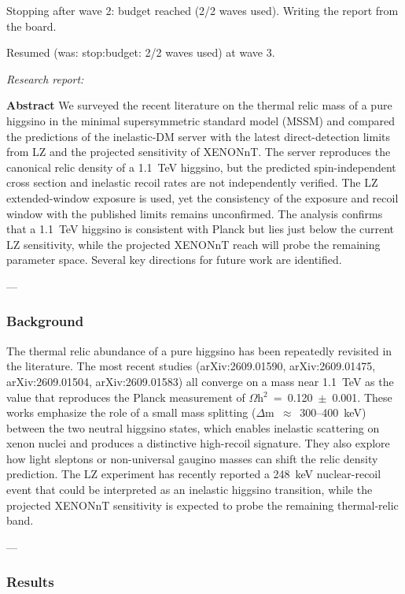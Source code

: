 \documentclass[11pt,a4paper]{article}
\begin{document}
Stopping after wave 2: budget reached (2/2 waves used). Writing the report from the board.

Resumed (was: stop:budget: 2/2 waves used) at wave 3.

\textit{Research report:}\par
\textbf{Abstract} We surveyed the recent literature on the thermal relic mass of a pure higgsino in the minimal supersymmetric standard model (MSSM) and compared the predictions of the inelastic-DM server with the latest direct-detection limits from LZ and the projected sensitivity of XENONnT.  The server reproduces the canonical relic density of a 1.1~TeV higgsino, but the predicted spin-independent cross section and inelastic recoil rates are not independently verified.  The LZ extended-window exposure is used, yet the consistency of the exposure and recoil window with the published limits remains unconfirmed.  The analysis confirms that a 1.1~TeV higgsino is consistent with Planck but lies just below the current LZ sensitivity, while the projected XENONnT reach will probe the remaining parameter space.  Several key directions for future work are identified.

---

\subsubsection*{Background}
The thermal relic abundance of a pure higgsino has been repeatedly revisited in the literature.  The most recent studies (arXiv:2609.01590, arXiv:2609.01475, arXiv:2609.01504, arXiv:2609.01583) all converge on a mass near 1.1~TeV as the value that reproduces the Planck measurement of $\Omega$h$^2$~=~0.120~$\pm$~0.001.  These works emphasize the role of a small mass splitting ($\Delta$m~$\approx$~300--400~keV) between the two neutral higgsino states, which enables inelastic scattering on xenon nuclei and produces a distinctive high-recoil signature.  They also explore how light sleptons or non-universal gaugino masses can shift the relic density prediction.  The LZ experiment has recently reported a 248~keV nuclear-recoil event that could be interpreted as an inelastic higgsino transition, while the projected XENONnT sensitivity is expected to probe the remaining thermal-relic band.

---

\subsubsection*{Results}
\end{document}
